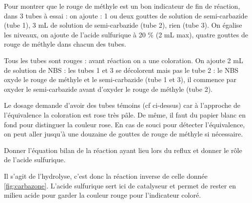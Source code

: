 \documentclass[twoside,a4paper,11pt,answers]{exam}
\begin{document}
\begin{questions}
\begin{solution}
Pour montrer que le rouge de méthyle est un bon indicateur de fin de réaction, dans 3 tubes à essai : 
on ajoute : 1 ou deux gouttes de solution de semi-carbazide (tube 1), 3 mL de solution de semi-carbazide (tube 2), rien (tube 3). On égalise les niveaux, on ajoute de l'acide sulfurique à 20 \% (2 mL max), quatre gouttes de rouge de méthyle dans chacun des tubes.

Tous les tubes sont rouges : avant réaction on a une coloration. On ajoute 2 mL de solution de NBS : les tubes 1 et 3 se décolorent mais pas le tube 2 : le NBS oxyde le rouge de méthyle et le semi-carbazide (tube 1 et 3), il commence par oxyder le semi-carbazide avant d'oxyder le rouge de méthyle (tube 2). 

\bigskip
Le dosage demande d'avoir des tubes témoins (cf ci-dessus) car à l'approche de l'équivalence la coloration est rose très pâle. De même, il faut du papier blanc en fond pour distinguer la couleur rose. En cas de souci pour détecter l'équivalence, on peut aller jusqu'à une douzaine de gouttes de rouge de méthyle si nécessaire.
\end{solution}

{}

\begin{framed}
\question Donner l'équation bilan de la réaction ayant lieu lors du reflux et donner le rôle de l'acide sulfurique.
\begin{solution}[3cm]
Il s'agit de l'hydrolyse, c'est donc la réaction inverse de celle donnée \ref{fig:carbazone}. L'acide sulfurique sert ici de catalyseur et permet de rester en milieu acide pour garder la couleur rouge pour l'indicateur coloré.
\end{solution}
\end{framed}


\end{questions}
\end{document}
